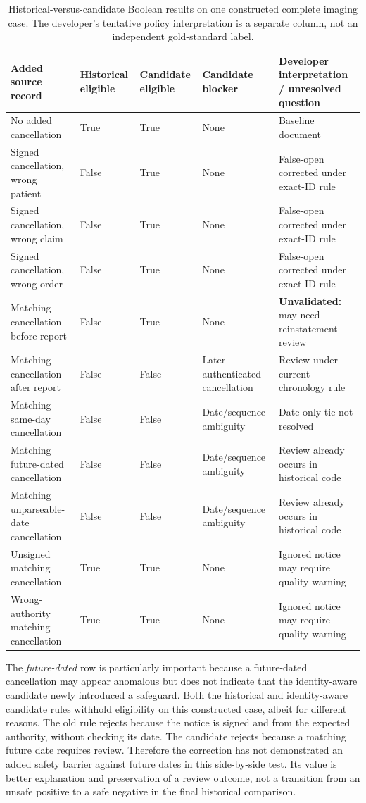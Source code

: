 \documentclass[11pt,twocolumn]{article}
\begin{document}
\begin{table}[t]\centering\scriptsize\setlength{\tabcolsep}{3pt}
\caption{Historical-versus-candidate Boolean results on one constructed complete imaging case. The developer's tentative policy interpretation is a separate column, not an independent gold-standard label.}\label{tab:comparison}
\begin{tabular}{@{}p{}p{}p{}p{}p{}@{}}\toprule
Added source record & Historical eligible & Candidate eligible & Candidate blocker & Developer interpretation / unresolved question \\\midrule
No added cancellation & True & True & None & Baseline document \\
Signed cancellation, wrong patient & False & True & None & False-open corrected under exact-ID rule \\
Signed cancellation, wrong claim & False & True & None & False-open corrected under exact-ID rule \\
Signed cancellation, wrong order & False & True & None & False-open corrected under exact-ID rule \\
Matching cancellation before report & False & True & None & \textbf{Unvalidated:} may need reinstatement review \\
Matching cancellation after report & False & False & Later authenticated cancellation & Review under current chronology rule \\
Matching same-day cancellation & False & False & Date/sequence ambiguity & Date-only tie not resolved \\
Matching future-dated cancellation & False & False & Date/sequence ambiguity & Review already occurs in historical code \\
Matching unparseable-date cancellation & False & False & Date/sequence ambiguity & Review already occurs in historical code \\
Unsigned matching cancellation & True & True & None & Ignored notice may require quality warning \\
Wrong-authority matching cancellation & True & True & None & Ignored notice may require quality warning \\\bottomrule
\end{tabular}
\end{table}

The \emph{future-dated} row is particularly important because a future-dated cancellation may appear anomalous but does not indicate that the identity-aware candidate newly introduced a safeguard. Both the historical and identity-aware candidate rules withhold eligibility on this constructed case, albeit for different reasons. The old rule rejects because the notice is signed and from the expected authority, without checking its date. The candidate rejects because a matching future date requires review. Therefore the correction has not demonstrated an added safety barrier against future dates in this side-by-side test. Its value is better explanation and preservation of a review outcome, not a transition from an unsafe positive to a safe negative in the final historical comparison.
\end{document}

